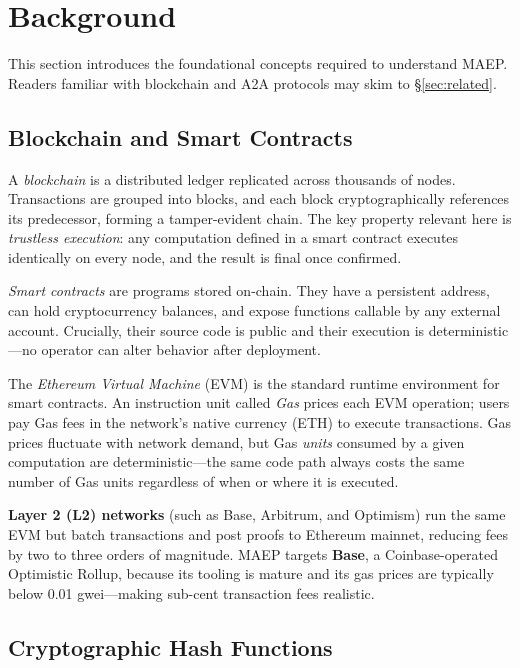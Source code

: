 \documentclass[conference]{IEEEtran}
\begin{document}
\section{Background}
\label{sec:background}

This section introduces the foundational concepts required to
understand MAEP.  Readers familiar with blockchain and A2A protocols
may skim to \S\ref{sec:related}.

\subsection{Blockchain and Smart Contracts}

A \emph{blockchain} is a distributed ledger replicated across thousands
of nodes.  Transactions are grouped into blocks, and each block
cryptographically references its predecessor, forming a tamper-evident
chain.  The key property relevant here is \emph{trustless execution}:
any computation defined in a smart contract executes identically on
every node, and the result is final once confirmed.

\emph{Smart contracts} are programs stored on-chain.  They have a
persistent address, can hold cryptocurrency balances, and expose
functions callable by any external account.  Crucially, their source
code is public and their execution is deterministic---no operator can
alter behavior after deployment.

The \emph{Ethereum Virtual Machine} (EVM) is the standard runtime
environment for smart contracts.  An instruction unit called
\emph{Gas} prices each EVM operation; users pay Gas fees in the
network's native currency (ETH) to execute transactions.  Gas prices
fluctuate with network demand, but Gas \emph{units} consumed by a
given computation are deterministic---the same code path always costs
the same number of Gas units regardless of when or where it is
executed.

\textbf{Layer 2 (L2) networks} (such as Base, Arbitrum, and Optimism)
run the same EVM but batch transactions and post proofs to Ethereum
mainnet, reducing fees by two to three orders of magnitude.
MAEP targets \textbf{Base}, a Coinbase-operated Optimistic Rollup,
because its tooling is mature and its gas prices are typically below
0.01 gwei---making sub-cent transaction fees realistic.

\subsection{Cryptographic Hash Functions}
\end{document}
